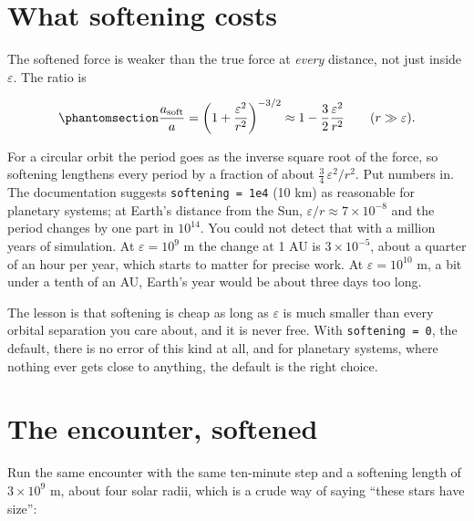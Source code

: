 \documentclass[
  10.5pt,
  letterpaper,
]{scrbook}
\theoremstyle{definition}
\theoremstyle{plain}
\theoremstyle{remark}
\begin{document}
\section{What softening costs}\label{what-softening-costs}

The softened force is weaker than the true force at \emph{every}
distance, not just inside \(\varepsilon\). The ratio is

\begin{equation}\protect\phantomsection\label{eq-softening-error}{
\frac{a_{\mathrm{soft}}}{a} = \left(1 + \frac{\varepsilon^2}{r^2}\right)^{-3/2} \approx 1 - \frac{3}{2}\frac{\varepsilon^2}{r^2}
\qquad (r \gg \varepsilon).
}\end{equation}

For a circular orbit the period goes as the inverse square root of the
force, so softening lengthens every period by a fraction of about
\(\tfrac34\,\varepsilon^2/r^2\). Put numbers in. The documentation
suggests \texttt{softening\ =\ 1e4} (10 km) as reasonable for planetary
systems; at Earth's distance from the Sun,
\(\varepsilon/r \approx 7\times10^{-8}\) and the period changes by one
part in \(10^{14}\). You could not detect that with a million years of
simulation. At \(\varepsilon = 10^9\) m the change at 1 AU is
\(3\times10^{-5}\), about a quarter of an hour per year, which starts to
matter for precise work. At \(\varepsilon = 10^{10}\) m, a bit under a
tenth of an AU, Earth's year would be about three days too long.

The lesson is that softening is cheap as long as \(\varepsilon\) is much
smaller than every orbital separation you care about, and it is never
free. With \texttt{softening\ =\ 0}, the default, there is no error of
this kind at all, and for planetary systems, where nothing ever gets
close to anything, the default is the right choice.

\section{The encounter, softened}\label{the-encounter-softened}

Run the same encounter with the same ten-minute step and a softening
length of \(3\times10^9\) m, about four solar radii, which is a crude
way of saying ``these stars have size'':
\end{document}

